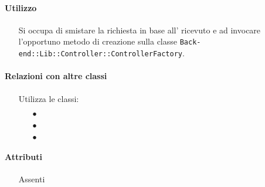 \paragraph*{Utilizzo}
\begin{itemize}
\item[] Si occupa di smistare la richiesta in base all' ricevuto e ad invocare l'opportuno metodo di creazione sulla classe \texttt{Back-end::Lib::Controller::ControllerFactory}.
\end{itemize}

\paragraph*{Relazioni con altre classi}
\begin{itemize}


\item[] Utilizza le classi:
\begin{itemize}
\item[$\bullet$] 
\item[$\bullet$] 
\item[$\bullet$] 
\end{itemize}
\end{itemize}

\paragraph*{Attributi}
\begin{itemize}
\item[] Assenti
\end{itemize}

